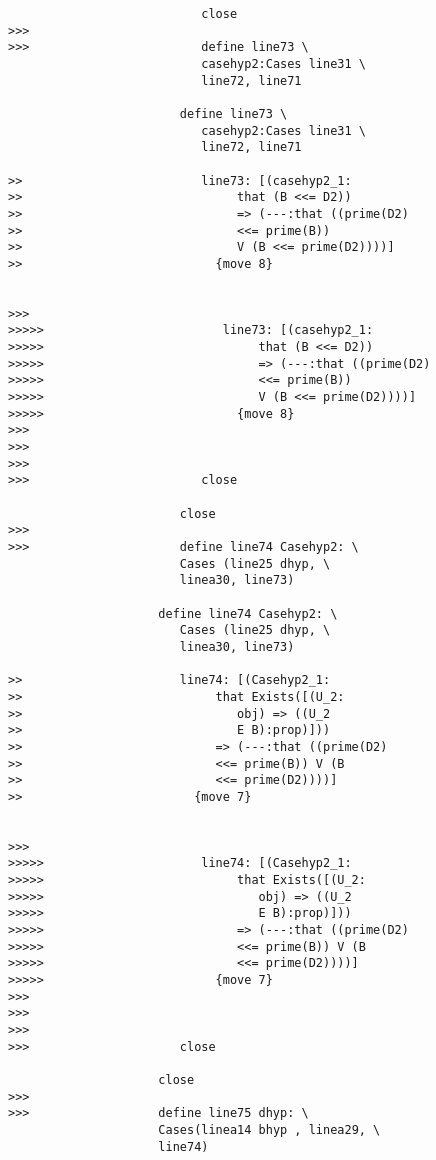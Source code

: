 \documentclass[12pt]{article}
\begin{document}
\begin{verbatim}
                           close
>>>
>>>                        define line73 \
                           casehyp2:Cases line31 \
                           line72, line71

                        define line73 \
                           casehyp2:Cases line31 \
                           line72, line71

>>                         line73: [(casehyp2_1:
>>                              that (B <<= D2))
>>                              => (---:that ((prime(D2)
>>                              <<= prime(B))
>>                              V (B <<= prime(D2))))]
>>                           {move 8}


>>>
>>>>>                         line73: [(casehyp2_1:
>>>>>                              that (B <<= D2))
>>>>>                              => (---:that ((prime(D2)
>>>>>                              <<= prime(B))
>>>>>                              V (B <<= prime(D2))))]
>>>>>                           {move 8}
>>>
>>>
>>>
>>>                        close

                        close
>>>
>>>                     define line74 Casehyp2: \
                        Cases (line25 dhyp, \
                        linea30, line73)

                     define line74 Casehyp2: \
                        Cases (line25 dhyp, \
                        linea30, line73)

>>                      line74: [(Casehyp2_1:
>>                           that Exists([(U_2:
>>                              obj) => ((U_2
>>                              E B):prop)]))
>>                           => (---:that ((prime(D2)
>>                           <<= prime(B)) V (B
>>                           <<= prime(D2))))]
>>                        {move 7}


>>>
>>>>>                      line74: [(Casehyp2_1:
>>>>>                           that Exists([(U_2:
>>>>>                              obj) => ((U_2
>>>>>                              E B):prop)]))
>>>>>                           => (---:that ((prime(D2)
>>>>>                           <<= prime(B)) V (B
>>>>>                           <<= prime(D2))))]
>>>>>                        {move 7}
>>>
>>>
>>>
>>>                     close

                     close
>>>
>>>                  define line75 dhyp: \
                     Cases(linea14 bhyp , linea29, \
                     line74)


\end{verbatim}
\end{document}
